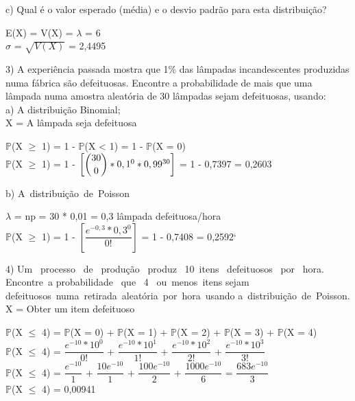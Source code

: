 \documentclass[12pt,a4paper]{article}
\begin{document}
	\vspace{1cm}
	c) Qual é o valor esperado (média) e o desvio padrão para esta distribuição?
	\begin{center}
		\vspace{0.5cm}
		E(X) = V(X) = $\lambda$ = 6
		\vspace{1cm}\\
		$\sigma$ = $\sqrt{V(X)}$ = 2,4495
	\end{center}
	\vspace{1cm}
	3) A experiência passada mostra que 1\% das lâmpadas incandescentes produzidas numa fábrica são defeituosas. Encontre a probabilidade de mais que uma lâmpada numa amostra aleatória de 30 lâmpadas sejam defeituosas, usando:\\
	a) A distribuição Binomial;
	\vspace{0.5cm}\\
	X = A lâmpada seja defeituosa
	\begin{center}
		\vspace{0.5cm}
		$\mathbb{P}$(X $\geq$ 1) = 1 - $\mathbb{P}$(X < 1) =  1 - $\mathbb{P}$(X = 0)
		\vspace{0.5cm}\\
		$\mathbb{P}$(X $\geq$ 1) = 1 - $\left[\dbinom{30}{0} * 0,1^{0} * 0,99^{30}\right]$ = 1 - 0,7397 = 0,2603
	\end{center}
	\vspace{1cm}
	b) A distribuição de Poisson
	\begin{center}
		\vspace{0.5cm}
		$\lambda$ = np = 30 * 0,01 = 0,3 lâmpada defeituosa/hora
		\vspace{1cm}\\
		$\mathbb{P}$(X $\geq$ 1) = 1 - $\left[\dfrac{e^{-0,3} * 0,3^{0}}{0!}\right]$ = 1 - 0,7408 = 0,2592`
	\end{center}
	\vspace{1cm}
	4) Um  processo  de  produção  produz  10 itens  defeituosos  por  hora.  Encontre a probabilidade  que  4  ou menos itens sejam defeituosos numa retirada aleatória por hora usando a distribuição de Poisson.
	\vspace{0.5cm}\\
	X = Obter um item defeituoso
	\begin{center}
		\vspace{0.5cm}
		$\mathbb{P}$(X $\leq$ 4) = $\mathbb{P}$(X = 0) + $\mathbb{P}$(X = 1) + $\mathbb{P}$(X = 2) + $\mathbb{P}$(X = 3) + $\mathbb{P}$(X = 4)
		\vspace{0.5cm}\\
		$\mathbb{P}$(X $\leq$ 4) = $\dfrac{e^{-10} * 10^{0}}{0!}$ + $\dfrac{e^{-10} * 10^{1}}{1!}$ + $\dfrac{e^{-10} * 10^{2}}{2!}$ + $\dfrac{e^{-10} * 10^{3}}{3!}$
		\vspace{0.5cm}\\
		$\mathbb{P}$(X $\leq$ 4) = $\dfrac{e^{-10}}{1}$ + $\dfrac{10e^{-10}}{1}$ + $\dfrac{100e^{-10}}{2}$ + $\dfrac{1000e^{-10}}{6}$ = $\dfrac{683e^{-10}}{3}$
		\vspace{0.5cm}\\
		$\mathbb{P}$(X $\leq$ 4) = 0,00941
	\end{center}
\end{document}
